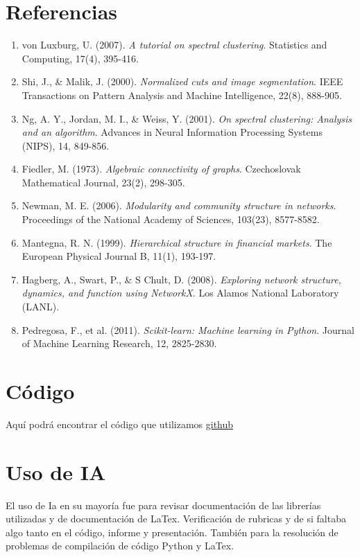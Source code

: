 \documentclass{article}
\begin{document}
	
	
	\section*{Referencias}

	\begin{enumerate}
		\item von Luxburg, U. (2007). \textit{A tutorial on spectral clustering}. Statistics and Computing, 17(4), 395-416.
		\item Shi, J., \& Malik, J. (2000). \textit{Normalized cuts and image segmentation}. IEEE Transactions on Pattern Analysis and Machine Intelligence, 22(8), 888-905.
		\item Ng, A. Y., Jordan, M. I., \& Weiss, Y. (2001). \textit{On spectral clustering: Analysis and an algorithm}. Advances in Neural Information Processing Systems (NIPS), 14, 849-856.
		\item Fiedler, M. (1973). \textit{Algebraic connectivity of graphs}. Czechoslovak Mathematical Journal, 23(2), 298-305.
		\item Newman, M. E. (2006). \textit{Modularity and community structure in networks}. Proceedings of the National Academy of Sciences, 103(23), 8577-8582.
		\item Mantegna, R. N. (1999). \textit{Hierarchical structure in financial markets}. The European Physical Journal B, 11(1), 193-197.
		\item Hagberg, A., Swart, P., \& S Chult, D. (2008). \textit{Exploring network structure, dynamics, and function using NetworkX}. Los Alamos National Laboratory (LANL).
		\item Pedregosa, F., et al. (2011). \textit{Scikit-learn: Machine learning in Python}. Journal of Machine Learning Research, 12, 2825-2830.
	\end{enumerate}
	\section*{Código}
	Aquí podrá encontrar el código que utilizamos	\href{https://github.com/troncos22/Tareas_2026_2}{github}
	\section*{Uso de IA}
	El uso de Ia en su mayoría fue para revisar documentación de las librerías utilizadas y de documentación de LaTex. Verificación de rubricas y de si faltaba algo tanto en el código, informe y presentación. También para la resolución de problemas de compilación de código Python y LaTex. 
\end{document}
